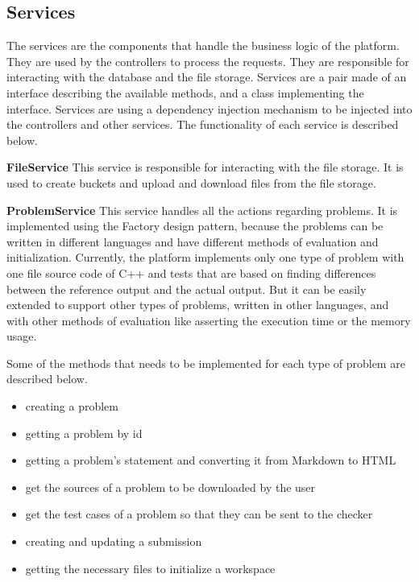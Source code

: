 \documentclass[12pt,a4paper]{report}
\begin{document}
\newpage
\subsection{Services}
The services are the components that handle the business logic of the platform. They are used by the controllers to process the requests. They are responsible for interacting with the database and the file storage. Services are a pair made of an interface describing the available methods, and a class implementing the interface. Services are using a dependency injection mechanism to be injected into the controllers and other services. The functionality of each service is described below.

\textbf{FileService}
This service is responsible for interacting with the file storage. It is used to create buckets\protect\footnotemark{} and upload and download files from the file storage.

\textbf{ProblemService}
This service handles all the actions regarding problems. It is implemented using the Factory design pattern, because the problems can be written in different languages and have different methods of evaluation and initialization. Currently, the platform implements only one type of problem with one file source code of C++ and tests that are based on finding differences between the reference output and the actual output. But it can be easily extended to support other types of problems, written in other languages, and with other methods of evaluation like asserting the execution time or the memory usage.

Some of the methods that needs to be implemented for each type of problem are described below.

\begin{itemize}
	\item creating a problem
	\item getting a problem by id
	\item getting a problem's statement and converting it from Markdown to HTML
	\item get the sources of a problem to be downloaded by the user
	\item get the test cases of a problem so that they can be sent to the checker
	\item creating and updating a submission
	\item getting the necessary files to initialize a workspace
\end{itemize}
\end{document}
